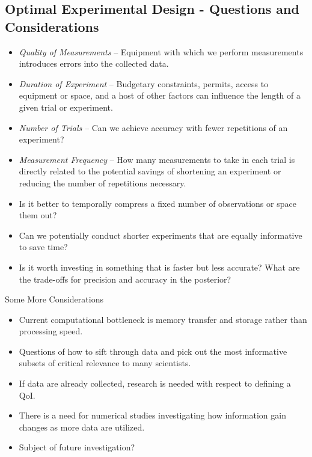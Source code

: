 \subsection{Optimal Experimental Design - Questions and Considerations}
\begin{frame}[t]
\begin{itemize}
	\item <1-> \emph{Quality of Measurements} -- Equipment with which we perform measurements introduces errors into the collected data.
	
	\item <2-> \emph{Duration of Experiment} -- Budgetary constraints, permits, access to equipment or space, and a host of other factors can influence the length of a given trial or experiment.
	
	\item <3-> \emph{Number of Trials} -- Can we achieve accuracy with fewer repetitions of an experiment?
	
	\item <4-> \emph{Measurement Frequency} -- How many measurements to take in each trial is directly related to the potential savings of shortening an experiment or reducing the number of repetitions necessary. 
	\item <4-> Is it better to temporally compress a fixed number of observations or space them out? 
	
	\item <5-> Can we potentially conduct shorter experiments that are equally informative to save time?
	\item <5-> Is it worth investing in something that is faster but less accurate? What are the trade-offs for precision and accuracy in the posterior?	
\end{itemize}

\end{frame}


\begin{frame}[t]{Some More Considerations}
\begin{itemize}
	\item Current computational bottleneck is memory transfer and storage rather than processing speed.
	\item Questions of how to sift through data and pick out the most informative subsets of critical relevance to many scientists.
	\item If data are already collected, research is needed with respect to defining a QoI.
	\item There is a need for numerical studies investigating how information gain changes as more data are utilized.
	\item Subject of future investigation?
\end{itemize}
\end{frame}
